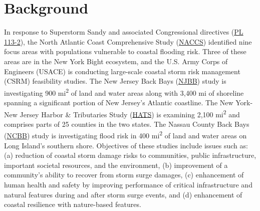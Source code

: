 \documentclass[
]{book}
\begin{document}
\hypertarget{background}{%
\chapter{Background}\label{background}}

In response to Superstorm Sandy and associated Congressional directives (\href{https://www.congress.gov/113/plaws/publ2/PLAW-113publ2.pdf}{PL 113-2}), the North Atlantic Coast Comprehensive Study (\href{https://www.nad.usace.army.mil/CompStudy/}{NACCS}) identified nine focus areas with populations vulnerable to coastal flooding risk. Three of these areas are in the New York Bight ecosystem, and the U.S. Army Corps of Engineers (USACE) is conducting large-scale coastal storm risk management (CSRM) feasibility studies. The New Jersey Back Bays (\href{https://www.nap.usace.army.mil/Missions/Civil-Works/New-Jersey-Back-Bays-Study/}{NJBB}) study is investigating 900 mi\textsuperscript{2} of land and water areas along with 3,400 mi of shoreline spanning a significant portion of New Jersey's Atlantic coastline. The New York-New Jersey Harbor \& Tributaries Study (\href{https://www.nan.usace.army.mil/Missions/Civil-Works/Projects-in-New-York/New-York-New-Jersey-Harbor-Tributaries-Focus-Area-Feasibility-Study/}{HATS}) is examining 2,100 mi\textsuperscript{2} and comprises parts of 25 counties in the two states. The Nassau County Back Bays (\href{https://www.nap.usace.army.mil/Missions/Civil-Works/Nassau-County-Back-Bays-Study/}{NCBB}) study is investigating flood risk in 400 mi\textsuperscript{2} of land and water areas on Long Island's southern shore. Objectives of these studies include issues such as: (a) reduction of coastal storm damage risks to communities, public infrastructure, important societal resources, and the environment, (b) improvement of a community's ability to recover from storm surge damages, (c) enhancement of human health and safety by improving performance of critical infrastructure and natural features during and after storm surge events, and (d) enhancement of coastal resilience with nature-based features.
\end{document}
